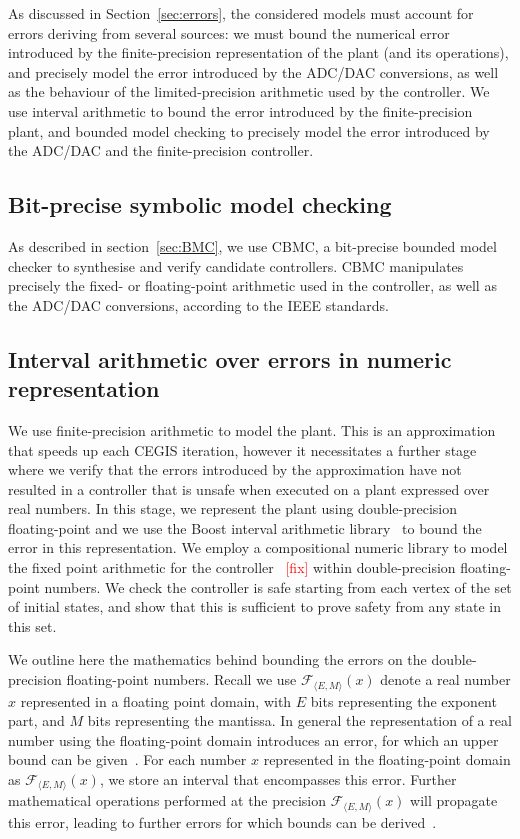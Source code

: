 \documentclass[twocolumn]{autart}    %
\renewcommand{\note}[1]{\textcolor{red}{[#1]}}
\begin{document}
As discussed in Section~\ref{sec:errors}, 
the considered models must account for errors deriving from several sources: 
we must bound the numerical error introduced by the finite-precision representation of the plant (and its operations), 
and precisely model the error introduced by the ADC/DAC conversions, 
as well as the behaviour of the limited-precision arithmetic used by the controller. 
We use interval arithmetic to bound the error introduced by the finite-precision plant, 
and bounded model checking to precisely model the error introduced by the ADC/DAC and the finite-precision controller.

\subsection{Bit-precise symbolic model checking}
As described in section~\ref{sec:BMC}, we use CBMC, a bit-precise bounded model checker to synthesise and verify candidate controllers. 
CBMC manipulates precisely the fixed- or floating-point arithmetic used in the controller, 
as well as the ADC/DAC conversions, 
according to the IEEE standards. 

\subsection{Interval arithmetic over errors in numeric representation} 
We use finite-precision arithmetic to model the plant. 
This is an approximation that speeds up each CEGIS iteration, 
however it necessitates a further stage where we verify that the errors introduced by the approximation have not resulted in a controller that is unsafe when executed on a plant expressed over real numbers.  
In this stage, we represent the plant using double-precision floating-point
and we use the Boost interval arithmetic library~\cite{DBLP:journals/tcs/BronnimannMP06} to bound the error in this representation. 
We employ a compositional numeric library to model the fixed point arithmetic for the controller~\cite{} \note{fix} within double-precision floating-point numbers. 
We check the controller is safe starting from each vertex of the set of initial states,  
and show that this is sufficient to prove safety from any state in this set. 

We outline here the mathematics behind bounding the errors on the double-precision floating-point numbers. 
Recall we use $\mathcal{F}_{\langle E,M \rangle}(x)$ denote a real number $x$ represented in a floating point domain, 
with $E$ bits representing the exponent part, and $M$ bits representing the mantissa. 
In general the representation of a real number using the floating-point domain introduces an error, 
for which an upper bound can be given~\cite{DBLP:conf/arith/BrainTRW15}.
For each number $x$ represented in the floating-point domain as $\mathcal{F}_{\langle E,M \rangle}(x)$, 
we store an interval that encompasses this error. 
Further mathematical operations performed at the precision $\mathcal{F}_{\langle E,M \rangle}(x)$ will propagate this error, 
leading to further errors for which bounds can be derived~\cite{DBLP:conf/arith/BrainTRW15}.  
\end{document}
